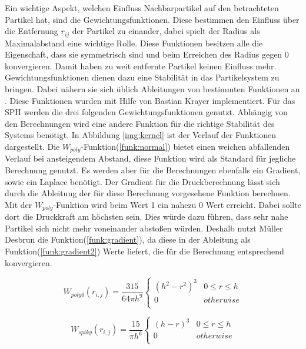 \documentclass[intern,palatino]{cgBA}
\begin{document}
Ein wichtige Aspekt, welchen Einfluss Nachbarpartikel auf den betrachteten Partikel hat, sind die Gewichtungsfunktionen. Diese bestimmen den Einfluss über die Entfernung $r_{ij}$ der Partikel zu einander, dabei spielt der Radius als Maximalabstand eine wichtige Rolle. Diese Funktionen besitzen alle die Eigenschaft, dass sie symmetrisch sind und beim Erreichen des Radius gegen 0 konvergieren. Damit haben zu weit entfernte Partikel keinen Einfluss mehr. Gewichtungsfunktionen dienen dazu eine Stabilität in das Partikelsystem zu bringen. Dabei nähern sie sich üblich Ableitungen von bestimmten Funktionen an \cite{muller2003particle}. Diese Funktionen wurden mit Hilfe von Bastian Krayer implementiert.
\newline
Für das SPH werden die drei folgenden Gewichtungsfunktionen genutzt. Abhängig von den Berechnungen wird eine andere Funktion für die richtige Stabilität des Systems benötigt. In Abbildung \ref{img:kernel} ist der Verlauf der Funktionen dargestellt.
\newline
Die $W_{poly}$-Funktion(\ref{funk:normal}) bietet einen weichen abfallenden Verlauf bei ansteigendem Abstand, diese Funktion wird als Standard für jegliche Berechnung genutzt.
\newline
Es werden aber für die Berechnungen ebenfalls ein Gradient, sowie ein Laplace benötigt. Der Gradient für die Druckberechnung lässt sich durch die Ableitung der für diese Berechnung vorgesehene Funktion berechnen. Mit der $W_{poly}$-Funktion wird beim Wert 1 ein nahezu 0 Wert erreicht. Dabei sollte dort die Druckkraft am höchsten sein.  Dies würde dazu führen, dass sehr nahe Partikel sich nicht mehr voneinander abstoßen würden. Deshalb nutzt Müller Desbrun \cite{desbrun1996smoothed} die Funktion(\ref{funk:gradient}), da diese in der Ableitung als Funktion(\ref{funk:gradient2}) Werte liefert, die für die Berechnung entsprechend konvergieren.
\newline\newline

\begin{equation}\label{funk:normal}
	W_{poly6}(r_{i,j}) = \frac{315}{64 \pi h^9}   
	\begin{cases}
	(h^2 - r^2)^3 		& 0	\leq r \leq h	\\
	0					& otherwise			\\
	\end{cases}
\end{equation}

\begin{equation}\label{funk:gradient}
W_{spiky}(r_{i,j}) = \frac{15}{\pi h^6}   
\begin{cases}
(h - r)^3 		& 0	\leq r \leq h	\\
0					& otherwise			\\
\end{cases}
\end{equation}
\end{document}
